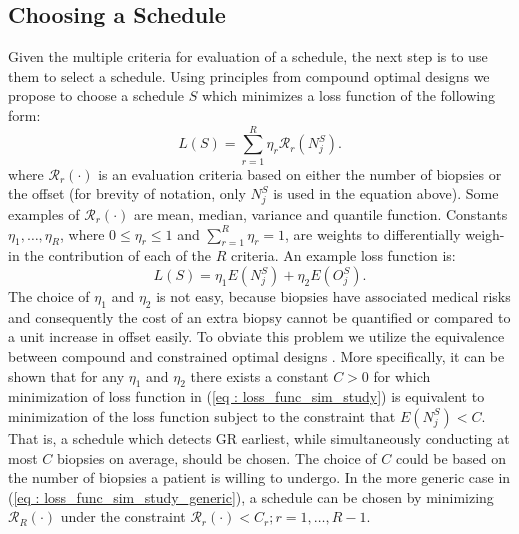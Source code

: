 \subsection{Choosing a Schedule}
Given the multiple criteria for evaluation of a schedule, the next step is to use them to select a schedule. Using principles from compound optimal designs \citep{lauter1976optimal} we propose to choose a schedule $S$ which minimizes a loss function of the following form:
\begin{equation}
\label{eq : loss_func_sim_study_generic}
L(S) = \sum_{r=1}^R \eta_r \mathcal{R}_r(N^S_j).
\end{equation}
where $\mathcal{R}_r(\cdot)$ is an evaluation criteria based on either the number of biopsies or the offset (for brevity of notation, only $N^S_j$ is used in the equation above). Some examples of $\mathcal{R}_r(\cdot)$ are mean, median, variance and quantile function. Constants $\eta_1, \ldots, \eta_R$, where $0 \leq \eta_r \leq 1$ and $\sum_{r=1}^R \eta_r = 1$, are weights to differentially weigh-in the contribution of each of the $R$ criteria. An example loss function is:
\begin{equation}
\label{eq : loss_func_sim_study}
L(S) = \eta_1 E(N^S_j) + \eta_2 E(O^S_j). 
\end{equation}
The choice of $\eta_1$ and $\eta_2$ is not easy, because biopsies have associated medical risks and consequently the cost of an extra biopsy cannot be quantified or compared to a unit increase in offset easily. To obviate this problem we utilize the equivalence between compound and constrained optimal designs \citep{cook1994equivalence}. More specifically, it can be shown that for any $\eta_1$ and $\eta_2$ there exists a constant $C>0$ for which minimization of loss function in (\ref{eq : loss_func_sim_study}) is equivalent to minimization of the loss function subject to the constraint that $E(N^S_j) < C$. That is, a schedule which detects GR earliest, while simultaneously conducting at most $C$ biopsies on average, should be chosen. The choice of $C$ could be based on the number of biopsies a patient is willing to undergo. In the more generic case in (\ref{eq : loss_func_sim_study_generic}), a schedule can be chosen by minimizing $\mathcal{R}_R(\cdot)$ under the constraint $\mathcal{R}_r(\cdot) < C_r; r=1, \ldots, R-1$.